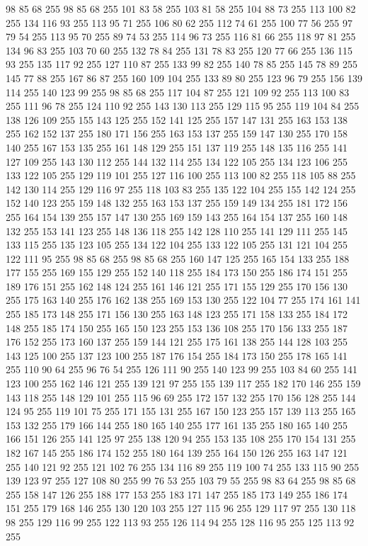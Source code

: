 98 85 68 255 98 85 68 255 101 83 58 255 103 81 58 255 104 88 73 255 113 100 82 255 134 116 93 255 113 95 71 255 106 80 62 255 112 74 61 255 100 77 56 255 97 79 54 255 113 95 70 255 89 74 53 255 114 96 73 255 116 81 66 255 118 97 81 255 134 96 83 255 103 70 60 255 132 78 84 255 131 78 83 255 120 77 66 255 136 115 93 255 135 117 92 255 127 110 87 255 133 99 82 255 140 78 85 255 145 78 89 255 145 77 88 255 167 86 87 255 160 109 104 255 133 89 80 255 123 96 79 255 156 139 114 255 140 123 99 255 98 85 68 255 117 104 87 255 121 109 92 255 113 100 83 255 111 96 78 255 124 110 92 255 143 130 113 255 129 115 95 255 119 104 84 255 138 126 109 255 155 143 125 255 152 141 125 255 157 147 131 255 163 153 138 255 162 152 137 255 180 171 156 255 163 153 137 255 159 147 130 255 170 158 140 255 167 153 135 255 161 148 129 255 151 137 119 255 148 135 116 255 141 127 109 255 143 130 112 255 144 132 114 255 134 122 105 255 134 123 106 255 133 122 105 255
129 119 101 255 127 116 100 255 113 100 82 255 118 105 88 255 142 130 114 255 129 116 97 255 118 103 83 255 135 122 104 255 155 142 124 255 152 140 123 255 159 148 132 255 163 153 137 255 159 149 134 255 181 172 156 255 164 154 139 255 157 147 130 255 169 159 143 255 164 154 137 255 160 148 132 255 153 141 123 255 148 136 118 255 142 128 110 255 141 129 111 255 145 133 115 255 135 123 105 255 134 122 104 255 133 122 105 255 131 121 104 255 122 111 95 255 98 85 68 255 98 85 68 255 160 147 125 255 165 154 133 255 188 177 155 255 169 155 129 255 152 140 118 255 184 173 150 255 186 174 151 255 189 176 151 255 162 148 124 255 161 146 121 255 171 155 129 255 170 156 130 255 175 163 140 255 176 162 138 255 169 153 130 255 122 104 77 255 174 161 141 255 185 173 148 255 171 156 130 255 163 148 123 255 171 158 133 255 184 172 148 255 185 174 150 255 165 150 123 255 153 136 108 255 170 156 133 255 187 176 152 255 173 160 137 255 159 144 121 255 175 161 138 255 144 128 103 255 143 125 100 255 137 123 100 255
187 176 154 255 184 173 150 255 178 165 141 255 110 90 64 255 96 76 54 255 126 111 90 255 140 123 99 255 103 84 60 255 141 123 100 255 162 146 121 255 139 121 97 255 155 139 117 255 182 170 146 255 159 143 118 255 148 129 101 255 115 96 69 255 172 157 132 255 170 156 128 255 144 124 95 255 119 101 75 255 171 155 131 255 167 150 123 255 157 139 113 255 165 153 132 255 179 166 144 255 180 165 140 255 177 161 135 255 180 165 140 255 166 151 126 255 141 125 97 255 138 120 94 255 153 135 108 255 170 154 131 255 182 167 145 255 186 174 152 255 180 164 139 255 164 150 126 255 163 147 121 255 140 121 92 255 121 102 76 255 134 116 89 255 119 100 74 255 133 115 90 255 139 123 97 255 127 108 80 255 99 76 53 255 103 79 55 255 98 83 64 255 98 85 68 255 158 147 126 255 188 177 153 255 183 171 147 255 185 173 149 255 186 174 151 255 179 168 146 255 130 120 103 255 127 115 96 255 129 117 97 255 130 118 98 255 129 116 99 255 122 113 93 255 126 114 94 255 128 116 95 255 125 113 92 255
